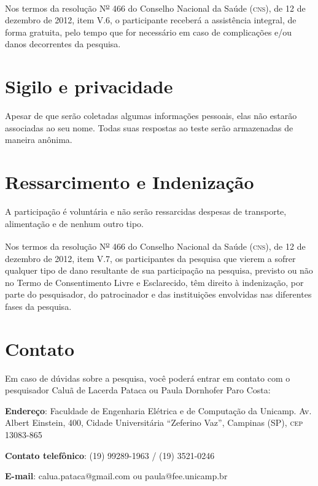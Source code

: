 \documentclass[a4paper,11pt,titlepage,singlespacing]{article}
\begin{document}
Nos termos da resolução N\textsuperscript{\underline{o}} 466 do Conselho Nacional da Saúde (\textsc{cns}), de 12 de dezembro de 2012, item V.6, o participante receberá a assistência integral, de forma gratuita, pelo tempo que for necessário em caso de complicações e/ou danos decorrentes da pesquisa.


\section*{Sigilo e privacidade}

\noindent Apesar de que serão coletadas algumas informações pessoais, elas não estarão associadas ao seu nome. Todas suas respostas ao teste serão armazenadas de maneira anônima.

\section*{Ressarcimento e Indenização}

\noindent A participação é voluntária e não serão ressarcidas despesas de transporte, alimentação e de nenhum outro tipo.

Nos termos da resolução N\textsuperscript{\underline{o}} 466 do Conselho Nacional da Saúde (\textsc{cns}), de 12 de dezembro de 2012, item V.7, os participantes da pesquisa que vierem a sofrer qualquer tipo de dano resultante de sua participação na pesquisa, previsto ou não no Termo de Consentimento Livre e Esclarecido, têm direito à indenização, por parte do pesquisador, do patrocinador e das instituições envolvidas nas diferentes fases da pesquisa.

\section*{Contato}

\noindent Em caso de dúvidas sobre a pesquisa, você poderá entrar em contato com o pesquisador Caluã de Lacerda Pataca ou Paula Dornhofer Paro Costa:

\noindent \textbf{Endereço}: Faculdade de Engenharia Elétrica e de Computação da Unicamp. Av. Albert Einstein, 400, Cidade Universitária “Zeferino Vaz”, Campinas (SP), \textsc{cep}
13083-865

\noindent \textbf{Contato telefônico}: (19) 99289-1963 / (19) 3521-0246

\noindent \textbf{E-mail}: calua.pataca@gmail.com ou paula@fee.unicamp.br \\
\end{document}
